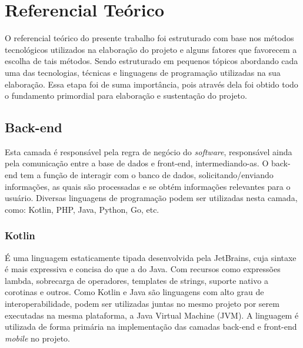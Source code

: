 \chapter{Referencial Teórico}
O referencial teórico do presente trabalho foi estruturado com base nos métodos tecnológicos utilizados na elaboração do projeto e alguns fatores que favorecem a escolha de tais métodos. Sendo estruturado em pequenos tópicos abordando cada uma das tecnologias, técnicas e linguagens de programação utilizadas na sua elaboração.
Essa etapa foi de suma importância, pois através dela foi obtido todo o fundamento primordial para elaboração e sustentação do projeto.


\section{Back-end}
Esta camada é responsável pela regra de negócio do \textit{software}, responsável ainda pela comunicação entre a base de dados e front-end, intermediando-as. O back-end tem a função de interagir com o banco de dados, solicitando/enviando informações, as quais são processadas e se obtém informações relevantes para o usuário. Diversas linguagens de programação podem ser utilizadas nesta camada, como: Kotlin, PHP, Java, Python, Go, etc.
\cite{universoprograma}

\subsection{Kotlin}
É uma linguagem estaticamente tipada desenvolvida pela JetBrains, cuja sintaxe é mais expressiva e concisa do que a do Java. Com recursos como expressões lambda, sobrecarga de operadores, templates de strings, suporte nativo a corotinas e outros.
Como Kotlin e Java são linguagens com alto grau de interoperabilidade, podem ser utilizadas juntas no mesmo projeto por serem executadas na mesma plataforma, a Java Virtual Machine (JVM).
A linguagem é utilizada de forma primária na implementação das camadas back-end e front-end \textit{mobile} no projeto.
\cite{kotlinemacao}

